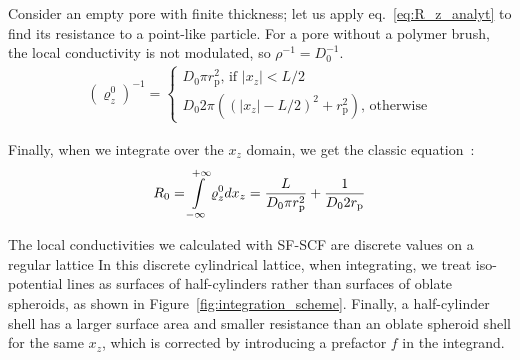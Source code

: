 \documentclass[10pt, a4paper]{article}
\begin{document}
\begin{multicols}{2}
Consider an empty pore with finite thickness; let us apply eq.~\ref{eq:R_z_analyt} to find its resistance to a point-like particle.
For a pore without a polymer brush, the local conductivity is not modulated, so $\rho^{-1} = D_0^{-1}$.
\begin{gather}
    \label{eq:r_z_empty}
    (\varrho_{z}^{0})^{-1} = 
    \begin{cases}
        D_0 \pi r_{\text{p}}^2 \text{, if } |x_z| < L/2
        \\
        D_0 2 \pi \left((|x_z|-L/2)^2 + r_{\text{p}}^2\right) \text{, otherwise} 
    \end{cases}
\end{gather}

Finally, when we integrate over the $x_z$ domain, we get the classic equation~\cite{Brunn1984}:
\begin{equation}
    \label{eq:r_empty}
    R_{0} = \int\displaylimits_{-\infty}^{+\infty} \varrho_{z}^{0} dx_z
    =\frac{L}{D_0 \pi r_{\text{p}}^2} + \frac{1}{D_0 2 r_{\text{p}}}
\end{equation}

The local conductivities we calculated with SF-SCF are discrete values on a regular lattice
In this discrete cylindrical lattice, when integrating, we treat iso-potential lines as surfaces of half-cylinders rather than surfaces of oblate spheroids, as shown in Figure~\ref{fig:integration_scheme}.
Finally, a half-cylinder shell has a larger surface area and smaller resistance than an oblate spheroid shell for the same $x_z$, which is corrected by introducing a prefactor $f$ in the integrand.


\end{multicols}
\end{document}
